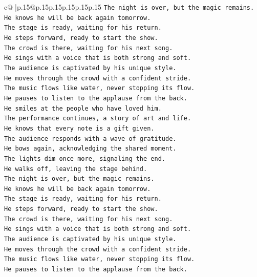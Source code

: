 \documentclass{article}
\begin{document}
{\begin{supertabular}{c@{$\;$}|p{.15\linewidth}@{}p{.15\linewidth}p{.15\linewidth}p{.15\linewidth}p{.15\linewidth}p{.15\linewidth}}
{{{\texttt{The night is over, but the magic remains.} \\
\texttt{He knows he will be back again tomorrow.} \\
\texttt{The stage is ready, waiting for his return.} \\
\texttt{He steps forward, ready to start the show.} \\
\texttt{The crowd is there, waiting for his next song.} \\
\texttt{He sings with a voice that is both strong and soft.} \\
\texttt{The audience is captivated by his unique style.} \\
\texttt{He moves through the crowd with a confident stride.} \\
\texttt{The music flows like water, never stopping its flow.} \\
\texttt{He pauses to listen to the applause from the back.} \\
\texttt{He smiles at the people who have loved him.} \\
\texttt{The performance continues, a story of art and life.} \\
\texttt{He knows that every note is a gift given.} \\
\texttt{The audience responds with a wave of gratitude.} \\
\texttt{He bows again, acknowledging the shared moment.} \\
\texttt{The lights dim once more, signaling the end.} \\
\texttt{He walks off, leaving the stage behind.} \\
\texttt{The night is over, but the magic remains.} \\
\texttt{He knows he will be back again tomorrow.} \\
\texttt{The stage is ready, waiting for his return.} \\
\texttt{He steps forward, ready to start the show.} \\
\texttt{The crowd is there, waiting for his next song.} \\
\texttt{He sings with a voice that is both strong and soft.} \\
\texttt{The audience is captivated by his unique style.} \\
\texttt{He moves through the crowd with a confident stride.} \\
\texttt{The music flows like water, never stopping its flow.} \\
\texttt{He pauses to listen to the applause from the back.} \\
}}}
\end{supertabular}}
\end{document}
